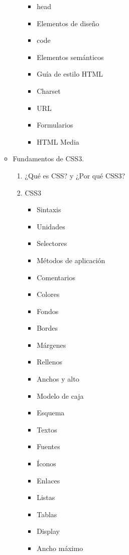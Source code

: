 \documentclass[12pt, letterpaper]{article}
\begin{document}
\begin{enumerate}
\begin{itemize}
\begin{enumerate}
\begin{itemize}
                \item head
                \item Elementos de diseño
                \item code
                \item Elementos semánticos
                \item Guía de estilo HTML
                \item Charset
                \item URL
                \item Formularios
                \item HTML Media
            \end{itemize}
        \end{enumerate}
        \item Fundamentos de CSS3.
        \begin{enumerate}
            \item ¿Qué es CSS? y ¿Por qué CSS3?
            \item CSS3
            \begin{itemize}
                \item Sintaxis
                \item Unidades
                \item Selectores
                \item Métodos de aplicación
                \item Comentarios
                \item Colores
                \item Fondos
                \item Bordes
                \item Márgenes
                \item Rellenos
                \item Anchos y alto
                \item Modelo de caja
                \item Esquema
                \item Textos
                \item Fuentes
                \item Íconos
                \item Enlaces
                \item Listas
                \item Tablas
                \item Display
                \item Ancho máximo

\end{itemize}
\end{enumerate}
\end{itemize}
\end{enumerate}
\end{document}
